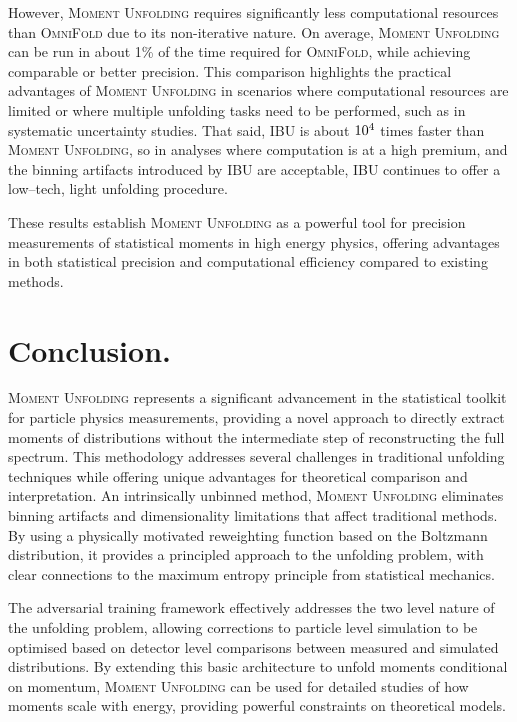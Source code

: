     However, \textsc{Moment Unfolding} requires significantly less computational resources than \textsc{\textsc{OmniFold}} due to its non-iterative nature.
    On average, \textsc{Moment Unfolding} can be run in about 1\% of the time required for {\textsc{OmniFold}}, while achieving comparable or better precision.
    This comparison highlights the practical advantages of \textsc{Moment Unfolding} in scenarios where computational resources are limited or where multiple unfolding tasks need to be performed, such as in systematic uncertainty studies.
    That said, IBU is about \(\num{d4}\) times faster than \textsc{Moment Unfolding}, so in analyses where computation is at a high premium, and the binning artifacts introduced by IBU are acceptable, IBU continues to offer a low--tech, light unfolding procedure.

    These results establish \textsc{Moment Unfolding} as a powerful tool for precision measurements of statistical moments in high energy physics, offering advantages in both statistical precision and computational efficiency compared to existing methods.

\section{Conclusion.}
    \textsc{Moment Unfolding} represents a significant advancement in the statistical toolkit for particle physics measurements, providing a novel approach to directly extract moments of distributions without the intermediate step of reconstructing the full spectrum.
    This methodology addresses several challenges in traditional unfolding techniques while offering unique advantages for theoretical comparison and interpretation.
    An intrinsically unbinned method, \textsc{Moment Unfolding} eliminates binning artifacts and dimensionality limitations that affect traditional methods.
    By using a physically motivated reweighting function based on the Boltzmann distribution, it provides a principled approach to the unfolding problem, with clear connections to the maximum entropy principle from statistical mechanics.

    The adversarial training framework effectively addresses the two level nature of the unfolding problem, allowing corrections to particle level simulation to be optimised based on detector level comparisons between measured and simulated distributions.
    By extending this basic architecture to unfold moments conditional on momentum, \textsc{Moment Unfolding} can be used for detailed studies of how moments scale with energy, providing powerful constraints on theoretical models.
    

